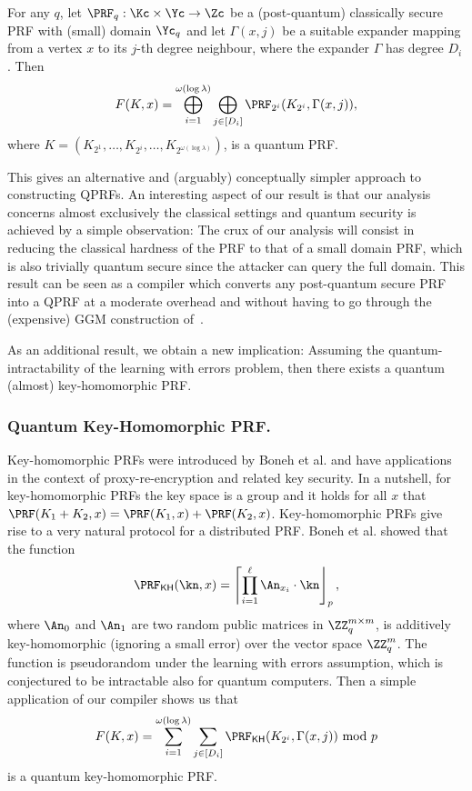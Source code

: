 \begin{theorem}[Informal]
For any $q$, let $\PRF_q: \Kc \times \Yc \to \Zc$ be a (post-quantum) classically secure PRF with (small) domain $\Yc_q$ and let $\Gamma(x,j)$ be a suitable expander mapping from a vertex $x$ to its $j$-th degree neighbour, where the expander $\Gamma$ has degree $D_i$. Then
$$
F(K,x) = \bigoplus_{i=1}^{\omega(\log\lambda)} \bigoplus_{j \in [D_i]}\PRF_{2^i}(K_{2^i}, \Gamma(x,j)),
$$
where $K=(K_{2^1},\dots,K_{2^i},\dots,K_{2^{\omega(\log\lambda)} })$\footnotemark, is a quantum PRF.
\end{theorem}
%
 

This gives an alternative and (arguably) conceptually simpler approach to constructing QPRFs. An interesting aspect of our result is that our analysis concerns almost exclusively the classical settings and quantum security is achieved by a simple observation: The crux of our analysis will consist in reducing the classical hardness of the PRF to that of a small domain PRF, which is also trivially quantum secure since the attacker can query the full domain. This result can be seen as a compiler which converts any post-quantum secure PRF into a QPRF at a moderate overhead and without having to go through the (expensive) GGM construction of~\cite{FOCS:Zhandry12}.

As an additional result, we obtain a new implication: Assuming the quantum-intractability of the learning with errors problem, then there exists a quantum (almost) key-homomorphic PRF.

\subsubsection{Quantum Key-Homomorphic PRF.} Key-homomorphic PRFs were introduced by Boneh et al. \cite{C:BLMR13} and have applications in the context of proxy-re-encryption and related key security. In a nutshell, for key-homomorphic PRFs the key space is a group and it holds for all $x$ that $\PRF(K_1 + K_2,x) = \PRF(K_1,x) + \PRF(K_2,x)$. Key-homomorphic PRFs give rise to a very natural protocol for a distributed PRF. Boneh et al. showed that the function
$$
\PRF_{\mathsf{KH}}(\kn, x) = \left\lceil \prod^\ell_{i=1} \An_{x_i}\cdot \kn \right\rfloor_p,
$$
where $\An_0$ and $\An_1$ are two random public matrices in $\ZZ_q^{m\times m}$, is additively key-homomorphic (ignoring a small error) over the vector space $\ZZ_q^m$. The function is pseudorandom under the learning with errors assumption, which is conjectured to be intractable also for quantum computers. Then a simple application of our compiler shows us that
$$
F(K,x) = \sum_{i=1}^{\omega(\log\lambda)} \sum_{j\in [D_i]} \PRF_{\mathsf{KH}}(K_{2^i}, \Gamma(x,j)) ~\text{mod }p
$$
is a quantum key-homomorphic PRF.

